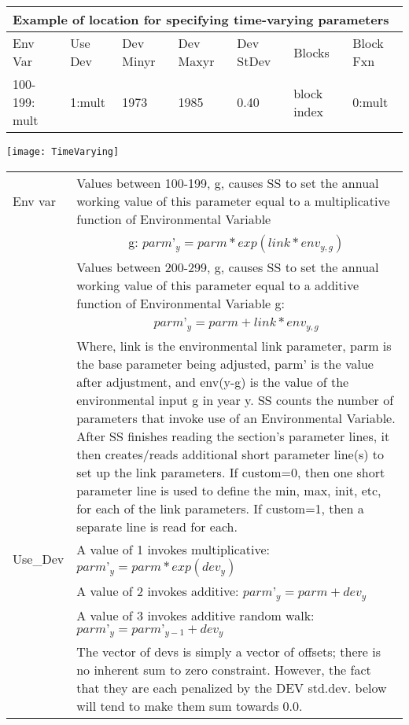 \begin{center}
	\begin{longtable}{p{2cm} p{2cm} p{2cm} p{2cm} p{2cm} p{2.25cm} p{1.75cm}}
		\multicolumn{7}{l}{Example of location for specifying time-varying parameters}\\
		\hline
		Env Var & Use Dev & Dev Minyr & Dev Maxyr & Dev StDev & Blocks & Block Fxn\\
		\hline
		100-199: mult & 1:mult & 1973 & 1985 & 0.40 & block index & 0:mult\\
		\hline
	\end{longtable}
\end{center}
\begin{center}
	\texttt{[image: TimeVarying]}
\end{center}
\begin{center}
	\begin{longtable}{p{2.5cm} p{13cm}}
		\hline
		Env var & Values between 100-199, g, causes SS to set the annual working value of this parameter equal to a multiplicative function of Environmental Variable\\
		    & \multicolumn{1}{c}{g: $parm’_y = parm * exp(link * env_{y,g})$ } \\
			& Values between 200-299, g, causes SS to set the annual working value of this parameter equal to a additive function of Environmental Variable g:\\
		    & \multicolumn{1}{c}{ $parm’_y = parm + link * env_{y,g}$}\\
			& Where, link is the environmental link parameter, parm is the base parameter being adjusted, parm’ is the value after adjustment, and env(y-g) is the value of the environmental input g in year y. SS counts the number of parameters that invoke use of an Environmental Variable.  After SS finishes reading the section’s parameter lines, it then creates/reads additional short parameter line(s) to set up the link parameters.  If custom=0, then one short parameter line is used to define the min, max, init, etc, for each of the link parameters.  If custom=1, then a separate line is read for each.\\
		\hline
		Use\_Dev & A value of 1 invokes multiplicative:  $parm’_y = parm * exp(dev_y)$\\
			& A value of 2 invokes additive:  $parm’_y = parm + dev_y$\\
			& A value of 3 invokes additive random walk:  $parm’_y = parm’_{y-1} + dev_y$\\
		    & The vector of devs is simply a vector of offsets; there is no inherent sum to zero constraint.  However, the fact that they are each penalized by the DEV std.dev. below will tend to make them sum towards 0.0.\\

\end{longtable}
\end{center}
